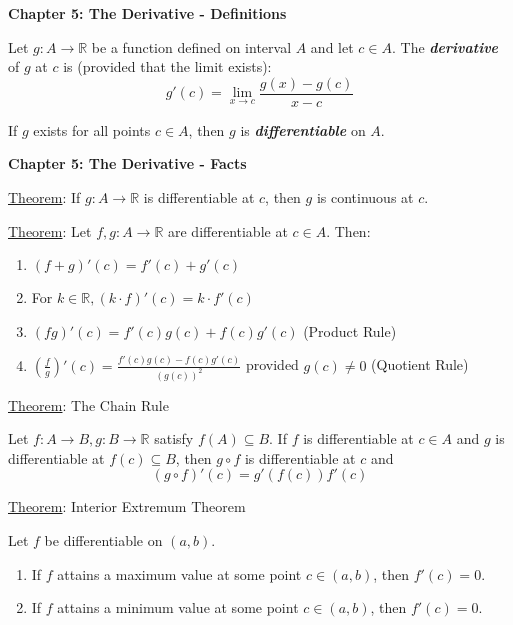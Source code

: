 \documentclass[12pt]{article}
\newcommand{\RR}{\mathbb{R}} %
\newcommand\parens[1]{\left( #1 \right)} %
\newcommand\defword[1]{\textit{\textbf{#1}}}
\begin{document}
\textbf{Chapter 5: The Derivative - Definitions}

\hrulefill

Let $g : A \rightarrow \RR$ be a function defined on interval $A$ and let $c \in A$. The \defword{derivative} of $g$ at $c$ is (provided that the limit exists):
\[
g'(c) = \lim \limits_{x \rightarrow c} \frac{g(x) - g(c)}{x - c}
\]

If $g$ exists for all points $c \in A$, then $g$ is \defword{differentiable} on $A$.

\pagebreak

\textbf{Chapter 5: The Derivative - Facts}

\hrulefill

\underline{Theorem}: If $g : A \rightarrow \RR$ is differentiable at $c$, then $g$ is continuous at $c$.

\hrulefill

\underline{Theorem}: Let $f, g : A \rightarrow \RR$ are differentiable at $c \in A$. Then:

\begin{enumerate}
\item $(f + g)'(c) = f'(c) + g'(c)$

\item For $k \in \RR, (k \cdot f)'(c) = k \cdot f'(c)$

\item $(fg)'(c) = f'(c)g(c) + f(c)g'(c)$ (Product Rule)

\item $\parens{\frac{f}{g}}'(c) = \frac{f'(c)g(c) - f(c)g'(c)}{(g(c))^2}$ provided $g(c) \ne 0$ (Quotient Rule)
\end{enumerate}

\hrulefill

\underline{Theorem}: The Chain Rule

Let $f : A \rightarrow B, g : B \rightarrow \RR$ satisfy $f(A) \subseteq B$. If $f$ is differentiable at $c \in A$ and $g$ is differentiable at $f(c) \subseteq B$, then $g \circ f$ is differentiable at $c$ and
\[
(g \circ f)'(c) = g'(f(c)) f'(c)
\]

\hrulefill

\underline{Theorem}: Interior Extremum Theorem

Let $f$ be differentiable on $(a, b)$.

\begin{enumerate}
\item If $f$ attains a maximum value at some point $c \in (a, b)$, then $f'(c) = 0$.

\item If $f$ attains a minimum value at some point $c \in (a, b)$, then $f'(c) = 0$.
\end{enumerate}
\end{document}
